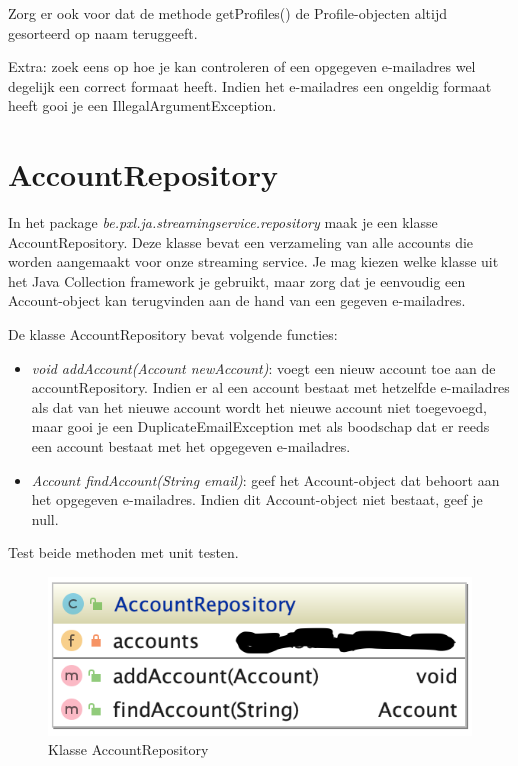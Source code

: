 \documentclass{tstextbook}
\begin{document}
Zorg er ook voor dat de methode getProfiles() de Profile-objecten altijd gesorteerd op naam teruggeeft. 

Extra: zoek eens op hoe je kan controleren of een opgegeven e-mailadres wel degelijk een correct formaat heeft. Indien het e-mailadres een ongeldig formaat heeft gooi je een IllegalArgumentException.


\section{AccountRepository}

In het package \textit{be.pxl.ja.streamingservice.repository} maak je een klasse AccountRepository.
Deze klasse bevat een verzameling van alle accounts die worden aangemaakt voor onze streaming service. Je mag kiezen welke klasse uit het Java Collection framework je gebruikt, maar zorg dat je eenvoudig een Account-object kan terugvinden aan de hand van een gegeven e-mailadres. 

De klasse AccountRepository bevat volgende functies:
\begin{itemize}
\item \textit{void addAccount(Account newAccount)}: voegt een nieuw account toe aan de accountRepository. Indien er al een account bestaat met hetzelfde e-mailadres als dat van het nieuwe account wordt het nieuwe account niet toegevoegd, maar gooi je een DuplicateEmailException met als boodschap dat er reeds een account bestaat met het opgegeven e-mailadres.

\item \textit{Account findAccount(String email)}: geef het Account-object dat behoort aan het opgegeven e-mailadres. Indien dit Account-object niet bestaat, geef je null.
\end{itemize}

Test beide methoden met unit testen.

\begin{figure}[H]
  \includegraphics{images/diagrams/accountrepository.png}
  \caption{Klasse AccountRepository}
  \label{fig:content_hierarchy}
\end{figure}
\end{document}
